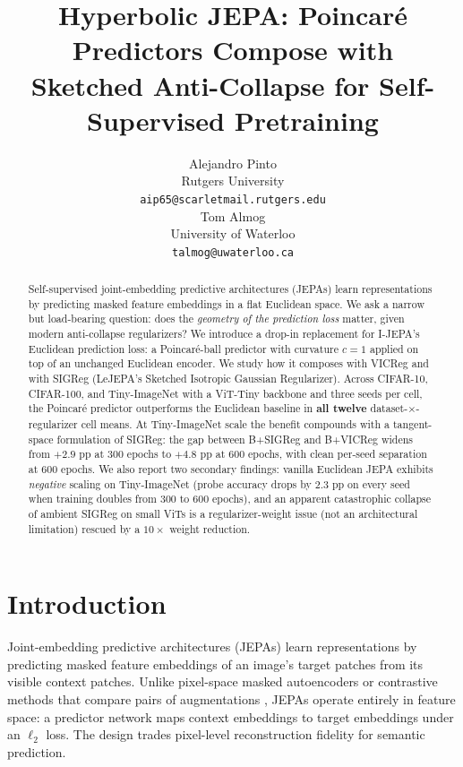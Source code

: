 \documentclass{article}
\title{Hyperbolic JEPA: Poincar\'{e} Predictors Compose with\\Sketched Anti-Collapse for Self-Supervised Pretraining}
\author{%
  Alejandro Pinto \\
  Rutgers University \\
  \texttt{aip65@scarletmail.rutgers.edu} \\
  \And
  Tom Almog \\
  University of Waterloo \\
  \texttt{talmog@uwaterloo.ca} \\
}
\begin{document}
\maketitle

\begin{abstract}
Self-supervised joint-embedding predictive architectures (JEPAs) learn representations by predicting masked feature embeddings in a flat Euclidean space. We ask a narrow but load-bearing question: does the \emph{geometry of the prediction loss} matter, given modern anti-collapse regularizers? We introduce a drop-in replacement for I-JEPA's Euclidean prediction loss: a Poincar\'{e}-ball predictor with curvature $c{=}1$ applied on top of an unchanged Euclidean encoder. We study how it composes with VICReg and with SIGReg (LeJEPA's Sketched Isotropic Gaussian Regularizer). Across CIFAR-10, CIFAR-100, and Tiny-ImageNet with a ViT-Tiny backbone and three seeds per cell, the Poincar\'{e} predictor outperforms the Euclidean baseline in \textbf{all twelve} dataset-$\times$-regularizer cell means. At Tiny-ImageNet scale the benefit compounds with a tangent-space formulation of SIGReg: the gap between B+SIGReg and B+VICReg widens from $+2.9$ pp at 300 epochs to $+4.8$ pp at 600 epochs, with clean per-seed separation at 600 epochs. We also report two secondary findings: vanilla Euclidean JEPA exhibits \emph{negative} scaling on Tiny-ImageNet (probe accuracy drops by $2.3$ pp on every seed when training doubles from 300 to 600 epochs), and an apparent catastrophic collapse of ambient SIGReg on small ViTs is a regularizer-weight issue (not an architectural limitation) rescued by a $10{\times}$ weight reduction.
\end{abstract}

\section{Introduction}
\label{sec:intro}

Joint-embedding predictive architectures (JEPAs) \citep{lecun2022path,assran2023ijepa} learn representations by predicting masked feature embeddings of an image's target patches from its visible context patches. Unlike pixel-space masked autoencoders \citep{he2022mae} or contrastive methods that compare pairs of augmentations \citep{chen2020simclr,caron2021dino}, JEPAs operate entirely in feature space: a predictor network maps context embeddings to target embeddings under an $\ell_2$ loss. The design trades pixel-level reconstruction fidelity for semantic prediction.
\end{document}
